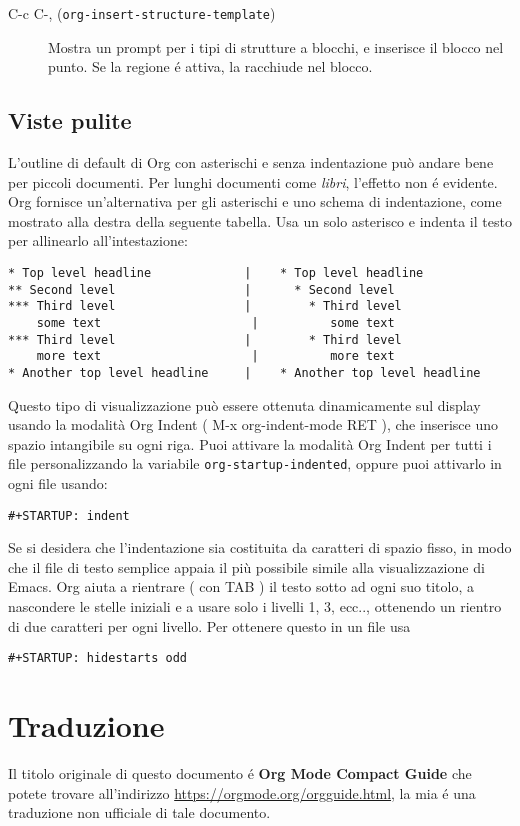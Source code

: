 \documentclass[11pt]{article}
\begin{document}
\begin{description}
\item[{C-c C-, (\texttt{org-insert-structure-template})}] Mostra un prompt per i tipi di strutture a blocchi, e inserisce il
blocco nel punto. Se la regione é attiva, la racchiude nel blocco.
\end{description}

\subsection*{Viste pulite}
\label{sec:orge584a6e}
L'outline di default di Org con asterischi e senza indentazione può
andare bene per piccoli documenti. Per lunghi documenti come \emph{libri},
l'effetto non é evidente. Org fornisce un'alternativa per gli
asterischi e uno schema di indentazione, come mostrato alla destra
della seguente tabella. Usa un solo asterisco e indenta il testo per
allinearlo all'intestazione:

\begin{verbatim}
* Top level headline             |    * Top level headline
** Second level                  |      * Second level
*** Third level                  |        * Third level
    some text                     |          some text
*** Third level                  |        * Third level
    more text                     |          more text
* Another top level headline     |    * Another top level headline
\end{verbatim}

Questo tipo di visualizzazione può essere ottenuta dinamicamente sul
display usando la modalità Org Indent ( M-x org-indent-mode RET ), che inserisce uno spazio intangibile su ogni riga. Puoi
attivare la modalità Org Indent per tutti i file personalizzando la
variabile \texttt{org-startup-indented}, oppure puoi attivarlo in ogni file
usando:

\begin{verbatim}
#+STARTUP: indent
\end{verbatim}


Se si desidera che l'indentazione sia costituita da caratteri di
spazio fisso, in modo che il file di testo semplice appaia il più
possibile simile alla visualizzazione di Emacs. Org aiuta a rientrare
( con TAB ) il testo sotto ad ogni suo titolo, a nascondere
le stelle iniziali e a usare solo i livelli 1, 3, ecc.., ottenendo un
rientro di due caratteri per ogni livello. Per ottenere questo in un
file usa

\begin{verbatim}
#+STARTUP: hidestarts odd
\end{verbatim}

\section{Traduzione}
\label{sec:org7117b82}
Il titolo originale di questo documento é \textbf{Org Mode Compact Guide} che potete
trovare all'indirizzo \url{https://orgmode.org/orgguide.html}, la mia é una
traduzione non ufficiale di tale documento.
\end{document}
